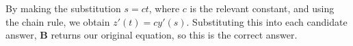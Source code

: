 \documentclass[a4paper, 11pt]{exam}
\begin{document}
\begin{questions}
\begin{parts}
        \part\qsixquestion
        \part\qsixquestion
        \part\qsixquestion
        \part\qsixquestion
    \end{parts}
    \begin{solution}
        By making the substitution $s = ct$, where $c$ is the relevant constant, and using the chain rule, we obtain $z'(t) = cy'(s)$. Substituting this into each candidate answer, \textbf{B} returns our original equation, so this is the correct answer.
    \end{solution}
\end{questions}
\end{document}
